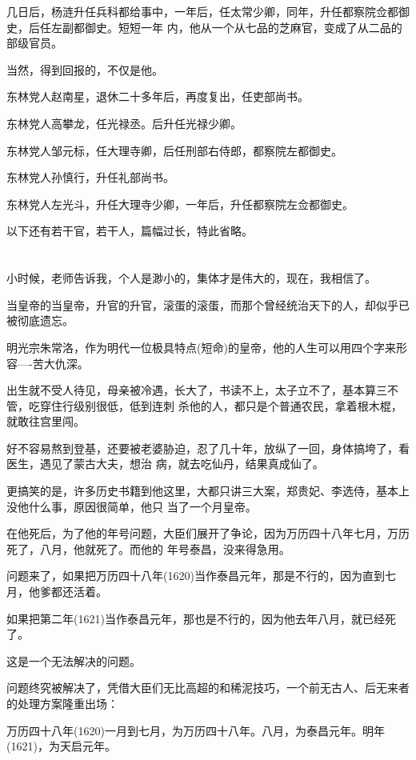 \documentclass[11pt,a4paper,onecolumn]{article}
\begin{document}
几日后，杨涟升任兵科都给事中，一年后，任太常少卿，同年，升任都察院佥都御史，后任左副都御史。短短一年
内，他从一个从七品的芝麻官，变成了从二品的部级官员。

当然，得到回报的，不仅是他。

东林党人赵南星，退休二十多年后，再度复出，任吏部尚书。

东林党人高攀龙，任光禄丞。后升任光禄少卿。

东林党人邹元标，任大理寺卿，后任刑部右侍郎，都察院左都御史。

东林党人孙慎行，升任礼部尚书。

东林党人左光斗，升任大理寺少卿，一年后，升任都察院左佥都御史。

以下还有若干官，若干人，篇幅过长，特此省略。

\section[\thesection]{}

小时候，老师告诉我，个人是渺小的，集体才是伟大的，现在，我相信了。

当皇帝的当皇帝，升官的升官，滚蛋的滚蛋，而那个曾经统治天下的人，却似乎已被彻底遗忘。

明光宗朱常洛，作为明代一位极具特点(短命)的皇帝，他的人生可以用四个字来形容----苦大仇深。

出生就不受人待见，母亲被冷遇，长大了，书读不上，太子立不了，基本算三不管，吃穿住行级别很低，低到连刺
杀他的人，都只是个普通农民，拿着根木棍，就敢往宫里闯。

好不容易熬到登基，还要被老婆胁迫，忍了几十年，放纵了一回，身体搞垮了，看医生，遇见了蒙古大夫，想治
病，就去吃仙丹，结果真成仙了。

更搞笑的是，许多历史书籍到他这里，大都只讲三大案，郑贵妃、李选侍，基本上没他什么事，原因很简单，他只
当了一个月皇帝。

在他死后，为了他的年号问题，大臣们展开了争论，因为万历四十八年七月，万历死了，八月，他就死了。而他的
年号泰昌，没来得急用。

问题来了，如果把万历四十八年(1620)当作泰昌元年，那是不行的，因为直到七月，他爹都还活着。

如果把第二年(1621)当作泰昌元年，那也是不行的，因为他去年八月，就已经死了。

这是一个无法解决的问题。

问题终究被解决了，凭借大臣们无比高超的和稀泥技巧，一个前无古人、后无来者的处理方案隆重出场：

万历四十八年(1620)一月到七月，为万历四十八年。八月，为泰昌元年。明年(1621)，为天启元年。
\end{document}
